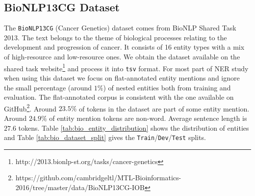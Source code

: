 \subsection{BioNLP13CG Dataset}

The \texttt{BioNLP13CG}\cite{pyysalo2015overview} (Cancer Genetics) dataset comes from BioNLP Shared Task 2013. The text belongs to the theme of biological processes relating to the development and progression of cancer. It consists of 16 entity types with a mix of high-resource and low-resource ones. We obtain the dataset available on the shared task website\footnote{http://2013.bionlp-st.org/tasks/cancer-genetics} and process it into \texttt{tsv} format. For most part of NER study when using this dataset we focus on flat-annotated entity mentions and ignore the small percentage (around $1\%$) of nested entities both from training and evaluation. The flat-annotated corpus is consistent with the one available on GitHub\footnote{https://github.com/cambridgeltl/MTL-Bioinformatics-2016/tree/master/data/BioNLP13CG-IOB}. Around $23.5\%$ of tokens in the dataset are part of some entity mention. Around $24.9\%$ of entity mention tokens are non-word. Average sentence length is $27.6$ tokens. Table \ref{tab:bio_entity_distribution} shows the distribution of entities and Table \ref{tab:bio_dataset_split} gives the \texttt{Train}/\texttt{Dev}/\texttt{Test} splits. 

